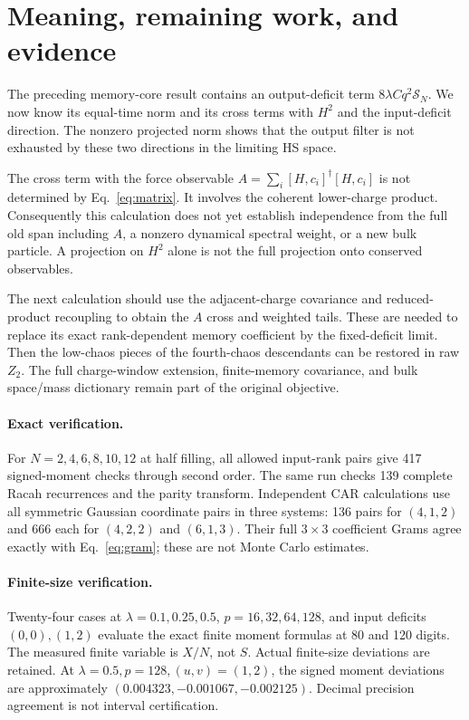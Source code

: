 \documentclass[11pt,a4paper]{article}
\begin{document}
\newpage
\section{Meaning, remaining work, and evidence}
The preceding memory-core result contains an output-deficit term
$8\lambda Cq^2\mathcal S_N$. We now know its equal-time norm and its
cross terms with $H^2$ and the input-deficit direction. The nonzero
projected norm shows that the output filter is not exhausted by
these two directions in the limiting HS space.

The cross term with the force observable
$A=\sum_i[H,c_i]^\dagger[H,c_i]$ is not determined by
Eq.~\eqref{eq:matrix}. It involves the coherent lower-charge product.
Consequently this calculation does not yet establish independence
from the full old span including $A$, a nonzero dynamical spectral
weight, or a new bulk particle. A projection on $H^2$ alone is not
the full projection onto conserved observables.

The next calculation should use the adjacent-charge covariance
and reduced-product recoupling to obtain the $A$ cross and weighted
tails. These are needed to replace its exact rank-dependent memory
coefficient by the fixed-deficit limit. Then the low-chaos pieces of
the fourth-chaos descendants can be restored in raw $Z_2$.
The full charge-window extension, finite-memory covariance, and
bulk space/mass dictionary remain part of the original objective.

\paragraph{Exact verification.}
For $N=2,4,6,8,10,12$ at half filling, all allowed input-rank pairs
give 417 signed-moment checks through second order. The same run
checks 139 complete Racah recurrences and the parity transform.
Independent CAR calculations use all symmetric Gaussian coordinate
pairs in three systems: 136 pairs for $(4,1,2)$ and 666 each for
$(4,2,2)$ and $(6,1,3)$. Their full $3\times3$ coefficient Grams
agree exactly with Eq.~\eqref{eq:gram}; these are not Monte Carlo
estimates.

\paragraph{Finite-size verification.}
Twenty-four cases at $\lambda=0.1,0.25,0.5$, $p=16,32,64,128$,
and input deficits $(0,0),(1,2)$ evaluate the exact finite moment
formulas at 80 and 120 digits. The measured finite variable is
$X/N$, not $S$. Actual finite-size deviations are retained.
At $\lambda=0.5,p=128,(u,v)=(1,2)$, the signed moment deviations
are approximately $(0.004323,-0.001067,-0.002125)$.
Decimal precision agreement is not interval certification.
\end{document}
